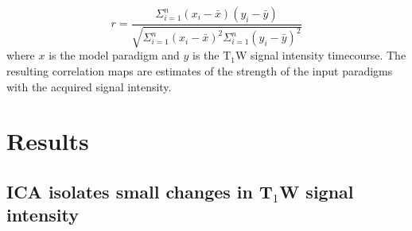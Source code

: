 \begin{equation}
r = \frac{\Sigma^n_{i=1} (x_i - \bar{x}) (y_i - \bar{y})}{\sqrt{\Sigma^n_{i=1} (x_i - \bar{x})^2 \Sigma^n_{i=1} (y_i - \bar{y})^2}}
\end{equation}
where $x$ is the model paradigm and $y$ is the T$_1$W signal intensity timecourse.
The resulting correlation maps are estimates of the strength of the input paradigms with the acquired signal intensity.

\section{Results}

\subsection{ICA isolates small changes in T$_1$W signal intensity}


